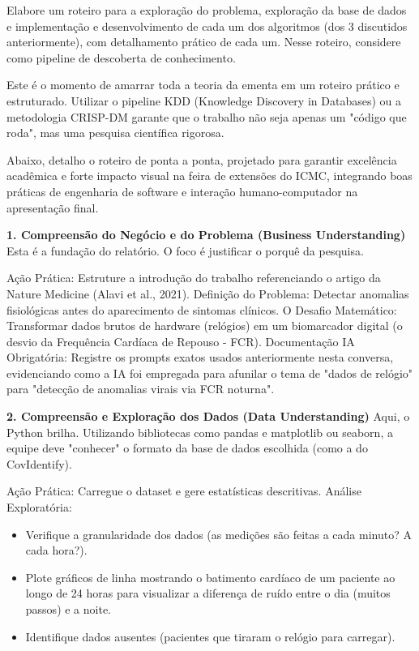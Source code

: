 \begin{description}
    Elabore um roteiro para a exploração do problema, exploração da base de dados e implementação e desenvolvimento de cada um dos algoritmos (dos 3 discutidos anteriormente), com detalhamento prático de cada um. Nesse roteiro, considere como pipeline de descoberta de conhecimento.

    \item[Gemini:] Este é o momento de amarrar toda a teoria da ementa em um roteiro prático e estruturado. Utilizar o pipeline KDD (Knowledge Discovery in Databases) ou a metodologia CRISP-DM garante que o trabalho não seja apenas um "código que roda", mas uma pesquisa científica rigorosa.

    Abaixo, detalho o roteiro de ponta a ponta, projetado para garantir excelência acadêmica e forte impacto visual na feira de extensões do ICMC, integrando boas práticas de engenharia de software e interação humano-computador na apresentação final.

    \textbf{1. Compreensão do Negócio e do Problema (Business Understanding)}
    Esta é a fundação do relatório. O foco é justificar o porquê da pesquisa.

    Ação Prática: Estruture a introdução do trabalho referenciando o artigo da Nature Medicine (Alavi et al., 2021).
    Definição do Problema: Detectar anomalias fisiológicas antes do aparecimento de sintomas clínicos.
    O Desafio Matemático: Transformar dados brutos de hardware (relógios) em um biomarcador digital (o desvio da Frequência Cardíaca de Repouso - FCR).
    Documentação IA Obrigatória: Registre os prompts exatos usados anteriormente nesta conversa, evidenciando como a IA foi empregada para afunilar o tema de "dados de relógio" para "detecção de anomalias virais via FCR noturna".

    \textbf{2. Compreensão e Exploração dos Dados (Data Understanding)}
    Aqui, o Python brilha. Utilizando bibliotecas como pandas e matplotlib ou seaborn, a equipe deve "conhecer" o formato da base de dados escolhida (como a do CovIdentify).

    Ação Prática: Carregue o dataset e gere estatísticas descritivas.
    Análise Exploratória:
    \begin{itemize}
        \item Verifique a granularidade dos dados (as medições são feitas a cada minuto? A cada hora?).
        \item Plote gráficos de linha mostrando o batimento cardíaco de um paciente ao longo de 24 horas para visualizar a diferença de ruído entre o dia (muitos passos) e a noite.
        \item Identifique dados ausentes (pacientes que tiraram o relógio para carregar).
    \end{itemize}


\end{description}
